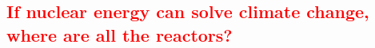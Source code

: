 \subsection{\textcolor{red}{If nuclear energy can solve climate change, where
are all the reactors?}}


